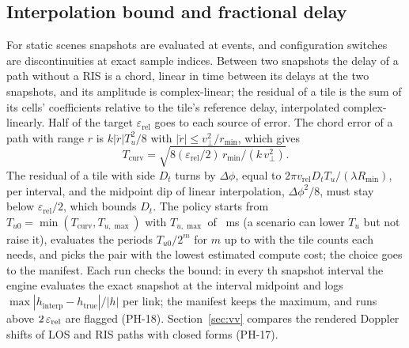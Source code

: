 \subsection{Interpolation bound and fractional delay}
For static scenes snapshots are evaluated at events, and configuration
switches are discontinuities at exact sample indices. Between two snapshots
the delay of a path without a RIS is a chord, linear in time between its delays at the two
snapshots, and its amplitude is complex-linear; the residual of a tile is the sum of its
cells' coefficients relative to the tile's reference delay, interpolated complex-linearly.
Half of the target $\varepsilon_{\mathrm{rel}}$ goes to each source of
error. The chord error of a path with range $r$ is $k|\ddot r|T_u^2/8$ with $|\ddot r|\le
v_\perp^2/r_{\min}$, which gives
\begin{equation}
T_{\mathrm{curv}}=\sqrt{8(\varepsilon_{\mathrm{rel}}/2)\,r_{\min}/(k\,v_\perp^2)}.
\label{eq:tcurv}
\end{equation}
The residual of a tile with side $D_t$ turns by $\Delta\phi$, equal to
$2\pi v_{\mathrm{rel}}D_tT_u/(\lambda R_{\min})$, per interval, and the midpoint dip of linear interpolation,
$\Delta\phi^2/8$, must stay below $\varepsilon_{\mathrm{rel}}/2$, which bounds $D_t$. The
policy starts from $T_{u0}=\min(T_{\mathrm{curv}},T_{u,\max})$ with $T_{u,\max}$ of
\numTuMaxMs~ms (a scenario can lower $T_u$ but not raise it), evaluates the periods
$T_{u0}/2^m$ for $m$ up to \numTuHalvingsMax{} with the tile counts each needs, and picks
the pair with the lowest estimated compute cost; the choice goes to the manifest.
Each run checks the bound: in every \numVerifyStride{}th snapshot
interval the engine evaluates the exact snapshot at the interval midpoint and logs
$\max|h_{\mathrm{interp}}-h_{\mathrm{true}}|/|h|$ per link; the manifest keeps the maximum,
and runs above $2\,\varepsilon_{\mathrm{rel}}$ are flagged (PH-18).
Section~\ref{sec:vv} compares the rendered Doppler shifts of LOS and RIS paths with closed
forms (PH-17).

